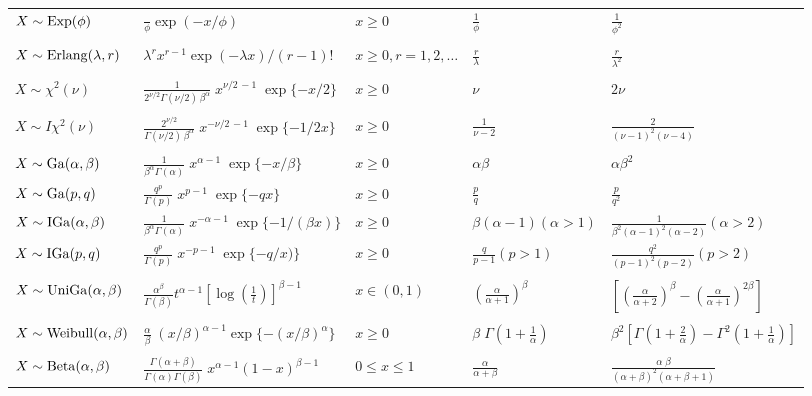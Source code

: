 \begin{tabular}{lllll}
$X \sim {\rm Exp}(\phi)$ & $ \frac{}{\phi}\exp(-x/\phi)$ & $x \geq 0$ & 
$ \frac{1}{\phi}$ & $\frac{1}{\phi^2}$ \\
\\
$X \sim {\rm Erlang}(\lambda, r)$ & $ \lambda^r x^{r-1} \exp(-\lambda x)/(r-1)!$ & $x \geq 0,  r = 1, 2, \ldots$ & 
$ \frac{r}{\lambda}$ & $\frac{r}{\lambda^2}$ \\
\\
$X \sim \chi^2(\nu)$ & $\frac{1}{2^{\nu/2}\Gamma(\nu/2) \, \beta^\alpha} \; x^{\nu/2 \,-1} \; \exp\{-x/2\}$ & $x \geq 0$  & $\nu$ & $2\nu$  \\
\\
$X \sim I\chi^2(\nu)$ & $\frac{2^{\nu/2}}{\Gamma(\nu/2) \, \beta^\alpha} \; x^{-\nu/2 \,-1} \; \exp\{-1/2x\}$ & $x \geq 0$  & $\frac{1}{\nu-2}$ & $\frac{2}{(\nu-1)^2(\nu-4)}$  \\
\\
$X \sim {\rm Ga}(\alpha, \beta)$ & $\frac{1}{\beta^\alpha\Gamma(\alpha)} \; x^{\alpha-1} \; \exp\{-x/\beta\}$ & $x \geq 0$  & $\alpha\beta$ & $\alpha\beta^2$  \\
	$X \sim {\rm Ga}(p, q)$ & $\frac{q^p}{\Gamma(p)} \; x^{p-1} \; \exp\{-q x\}$ & $x \geq 0$  & $\frac{p}{q}$ & $\frac{p}{q^2}$  \\
$X \sim {\rm IGa}(\alpha, \beta)$ & $\frac{1}{\beta^\alpha\Gamma(\alpha)} \; x^{-\alpha-1} \; \exp\{-1/(\beta x)\}$ & $x \geq 0$  & $\beta(\alpha-1) (\alpha>1)$  & $\frac{1}{\beta^2(\alpha-1)^2(\alpha-2)}(\alpha>2)$  \\
	$X \sim {\rm IGa}(p, q)$ & $\frac{q^p}{\Gamma(p)} \; x^{-p-1} \; \exp\{-q/x)\}$ & $x \geq 0$  & $\frac{q}{p-1} (p>1)$  & $\frac{q^2}{(p-1)^2(p-2)}(p>2)$  \\
\\
$X \sim {\rm UniGa}(\alpha, \beta)$ & $\frac{\alpha^{\beta}}{\Gamma(\beta)} t^{\alpha - 1} \left[\log\left(\frac{1}{t}\right) \right]^{\beta - 1}$  &  $x \in (0,1) $  & $\left(\frac{\alpha}{\alpha + 1}\right)^\beta$ &  $\left[\left(\frac{\alpha}{\alpha + 2}\right)^\beta - \left(\frac{\alpha}{\alpha + 1}\right)^{2\beta} \right]$ \\
\\
$X \sim {\rm Weibull}(\alpha, \beta)$ & $\frac{\alpha}{\beta} \; (x/\beta)^{\alpha-1} \exp\{-(x/\beta)^{\alpha}\}$  &  $x \geq 0$  & $\beta \; \Gamma(1+\frac{1}{\alpha})$ &  $\beta^{2} \left[\Gamma(1+\frac{2}{\alpha}) - \Gamma^2(1+\frac{1}{\alpha}) \right]$ \\
\\
  $X \sim {\rm Beta}(\alpha, \beta)$ & $\frac{\Gamma(\alpha+\beta)}{\Gamma(\alpha)\Gamma(\beta)} \; x^{\alpha-1} (1-x)^{\beta-1}$  &  $0 \leq x \leq 1$ & $\frac{\alpha}{\alpha+\beta}$ & $\frac{\alpha \; \beta}{(\alpha+\beta)^2 (\alpha + \beta + 1)}$ \\

\end{tabular}
